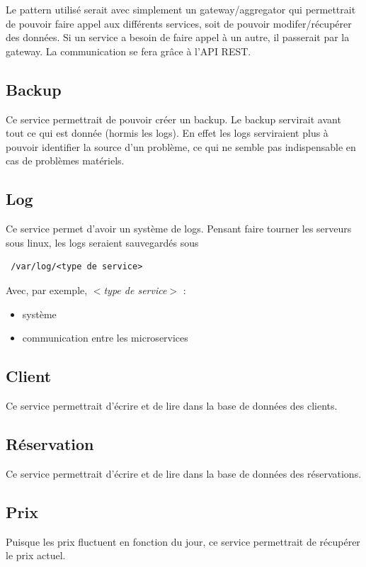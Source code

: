 \documentclass{article}
\begin{document}
\vspace{1cm}
Le pattern utilis\'e serait avec simplement un gateway/aggregator qui permettrait de pouvoir faire appel aux diff\'erents services, soit de pouvoir modifer/r\'ecup\'erer des donn\'ees. Si un service a besoin de faire appel \`a un autre, il passerait par la gateway. La communication se fera gr\^{a}ce \`a l'API REST.

\subsection{Backup}
Ce service permettrait de pouvoir cr\'eer un backup. Le backup servirait avant tout ce qui est donn\'ee (hormis les logs). En effet les logs serviraient plus \`a pouvoir identifier la source d'un probl\`eme, ce qui ne semble pas indispensable en cas de probl\`emes mat\'eriels.


\subsection{Log}
Ce service permet d'avoir un syst\`eme de logs. Pensant faire tourner les serveurs sous linux, les logs seraient sauvegard\'es sous \begin{verbatim} /var/log/<type de service> \end{verbatim}
\leavevmode \linebreak[3]
Avec, par exemple, \textit{$<$type de service$>$} :
\begin{itemize}
	\item syst\`eme
	\item communication entre les microservices
\end{itemize}


\subsection{Client}
Ce service permettrait d'\'{e}crire et de lire dans la base de donn\'ees des clients.

\subsection{R\'eservation}
Ce service permettrait d'\'{e}crire et de lire dans la base de donn\'ees des r\'eservations.


\subsection{Prix}
Puisque les prix fluctuent en fonction du jour, ce service permettrait de r\'ecup\'erer le prix actuel.
\end{document}

